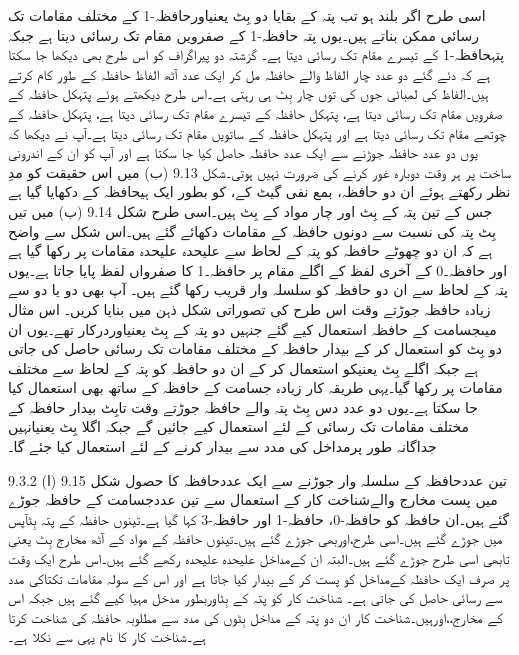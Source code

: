 	اسی طرح اگر بلند ہو تب پتہ کے بقایا دو بِٹ یعنیاورحافظہ-1 کے مختلف مقامات تک رسائی ممکن بناتے ہیں۔یوں پتہ حافظہ-1 کے صفرویں مقام تک رسائی دیتا ہے جبکہ پتہحافظہ-1 کے تیسرے مقام تک رسائی دیتا ہے۔
	گزشتہ دو پیراگراف کو اس طرح بھی دیکھا جا سکتا ہے کہ دئے گئے دو عدد چار الفاظ والے حافظہ مل کر ایک عدد آٹھ الفاظ حافظہ کے طور کام کرتے ہیں۔الفاظ کی لمبائی جوں کی توں چار بِٹ ہی رہتی ہے۔اس طرح دیکھتے ہوئے پتہکل حافظہ کے صفرویں مقام تک رسائی دیتا ہے، پتہکل حافظہ کے تیسرے مقام تک رسائی دیتا ہے، پتہکل حافظہ کے چوتھے مقام تک رسائی دیتا ہے اور پتہکل حافظہ کے ساتویں مقام تک رسائی دیتا ہے۔آپ نے دیکھا کہ یوں دو عدد حافظہ جوڑنے سے ایک عدد حافظہ حاصل کیا جا سکتا ہے اور آپ کو ان کے اندرونی ساخت پر ہر وقت دوبارہ غور کرنے کی ضرورت نہیں ہوتی۔شکل 9.13 (ب) میں اس حقیقت کو مدِ نظر رکھتے ہوئے ان دو حافظہ، بمع نفی گیٹ کے، کو بطور ایک ہیحافظہ کے دکھایا گیا ہے جس کے تین پتہ کے بِٹ اور چار مواد کے بِٹ ہیں۔اسی طرح  شکل 9.14 (ب) میں تیں بِٹ پتہ کی نسبت سے دونوں حافظہ کے مقامات دکھائے گئے ہیں۔اس شکل سے واضح ہے کہ ان دو چھوٹے حافظہ کو پتہ کے لحاظ سے علیحدہ علیحدہ مقامات پر رکھا گیا ہے اور حافظہ۔0 کے آخری لفظ کے اگلے مقام پر حافظہ۔1 کا صفرواں لفظ پایا جاتا ہے۔یوں پتہ کے لحاظ سے ان دو حافظہ کو سلسلہ وار قریب رکھا گئے ہیں۔ آپ بھی دو یا دو سے زیادہ حافظہ جوڑتے وقت اس طرح کی تصوراتی شکل ذہن میں بنایا کریں۔
	اس مثال میںجسامت کے حافظہ استعمال کیے گئے جنہیں دو پتہ کے بِٹ یعنیاوردرکار تھے۔یوں ان دو بِٹ کو استعمال کر کے بیدار حافظہ کے مختلف مقامات تک رسائی حاصل کی جاتی ہے جبکہ اگلے بِٹ یعنیکو استعمال کر کے ان دو حافظہ کو پتہ کے لحاظ سے مختلف مقامات پر رکھا گیا۔یہی طریقہ کار زیادہ جسامت کے حافظہ کے ساتھ بھی استعمال کیا جا سکتا ہے۔یوں دو عدد دس بِٹ پتہ والے حافظہ جوڑتے وقت تابِٹ بیدار حافظہ کے مختلف مقامات تک رسائی کے لئے استعمال کیے جائیں گے جبکہ اگلا بِٹ یعنیانہیں جداگانہ طور پرمداخل کی مدد سے بیدار کرنے کے لئے استعمال کیا جئے گا۔ 

9.3.2 تین عددحافظہ کے سلسلہ وار جوڑنے سے ایک عددحافظہ کا حصول
	شکل 9.15 (ا) میں پست مخارج والےشناخت کار کے استعمال سے تین عددجسامت کے حافظہ جوڑے گئے ہیں۔ان حافظہ کو حافظہ-0، حافظہ-1 اور حافظہ-3 کہا گیا ہے۔تینوں حافظہ کے پتہ بِٹآپس میں جوڑے گئے ہیں۔اسی طرح،اوربھی جوڑے گئے ہیں۔تینوں حافظہ کے مواد کے آٹھ مخارج بِٹ یعنی تابھی اسی طرح جوڑے گئے ہیں۔البتہ ان کےمداخل علیحدہ علیحدہ رکھے گئے ہیں۔اس طرح ایک وقت پر صرف ایک حافظہ کےمداخل کو پست کر کے بیدار کیا جاتا ہے اور اس کے سولہ مقامات تکتاکی مدد سے رسائی حاصل کی جاتی ہے۔
	 شناخت کار کو پتہ کے بِٹاوربطور مدخل مہیا کیے گئے ہیں جبکہ اس کے مخارج،،اورہیں۔شناخت کار ان دو پتہ کے مداخل بِٹوں کی مدد سے مطلوبہ حافظہ کی شناخت کرتا ہے۔شناخت کار کا نام یہی سے نکلا ہے۔


